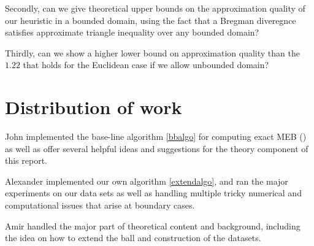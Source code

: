\documentclass[11pt]{myclass}
\begin{document}
Secondly, can we give theoretical upper bounds on the approximation quality of our heuristic in a bounded domain, using the fact that a Bregman diveregnce satisfies approximate triangle inequality over any bounded domain?

Thirdly, can we show a higher lower bound on approximation quality than the $1.22$ that holds for the Euclidean case if we allow unbounded domain?

\newpage





\appendix

\section{Distribution of work}
John implemented the base-line algorithm \ref{bbalgo} for computing exact MEB (\cite{bbc}) as well as offer several helpful ideas
and suggestions for the theory component of this report.  

Alexander implemented our own algorithm \ref{extendalgo}, and ran the major experiments on our data sets as well as handling 
multiple tricky numerical and computational issues that arise at boundary cases.

Amir handled the major part of theoretical content and background, including the idea on how to extend the ball and construction of the
datasets.
\end{document}
